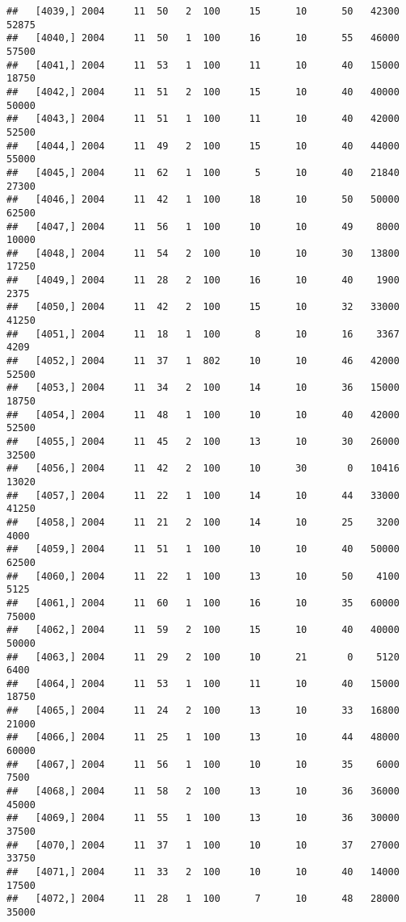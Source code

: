 \documentclass{article}\usepackage[]{graphicx}\usepackage[]{color}
\makeatletter
\newenvironment{kframe}{%
 \def\at@end@of@kframe{}%
 \ifinner\ifhmode%
  \def\at@end@of@kframe{\end{minipage}}%
  \begin{minipage}{\columnwidth}%
 \fi\fi%
 \def\FrameCommand##1{\hskip\@totalleftmargin \hskip-\fboxsep
 \colorbox{shadecolor}{##1}\hskip-\fboxsep
     \hskip-\linewidth \hskip-\@totalleftmargin \hskip\columnwidth}%
 \MakeFramed {\advance\hsize-\width
   \@totalleftmargin\z@ \linewidth\hsize
   \@setminipage}}%
 {\par\unskip\endMakeFramed%
 \at@end@of@kframe}
\newenvironment{knitrout}{}{} %
\makeatother
\begin{document}
\begin{knitrout}
\begin{kframe}
\begin{verbatim}
##   [4039,] 2004     11  50   2  100     15      10      50   42300   52875
##   [4040,] 2004     11  50   1  100     16      10      55   46000   57500
##   [4041,] 2004     11  53   1  100     11      10      40   15000   18750
##   [4042,] 2004     11  51   2  100     15      10      40   40000   50000
##   [4043,] 2004     11  51   1  100     11      10      40   42000   52500
##   [4044,] 2004     11  49   2  100     15      10      40   44000   55000
##   [4045,] 2004     11  62   1  100      5      10      40   21840   27300
##   [4046,] 2004     11  42   1  100     18      10      50   50000   62500
##   [4047,] 2004     11  56   1  100     10      10      49    8000   10000
##   [4048,] 2004     11  54   2  100     10      10      30   13800   17250
##   [4049,] 2004     11  28   2  100     16      10      40    1900    2375
##   [4050,] 2004     11  42   2  100     15      10      32   33000   41250
##   [4051,] 2004     11  18   1  100      8      10      16    3367    4209
##   [4052,] 2004     11  37   1  802     10      10      46   42000   52500
##   [4053,] 2004     11  34   2  100     14      10      36   15000   18750
##   [4054,] 2004     11  48   1  100     10      10      40   42000   52500
##   [4055,] 2004     11  45   2  100     13      10      30   26000   32500
##   [4056,] 2004     11  42   2  100     10      30       0   10416   13020
##   [4057,] 2004     11  22   1  100     14      10      44   33000   41250
##   [4058,] 2004     11  21   2  100     14      10      25    3200    4000
##   [4059,] 2004     11  51   1  100     10      10      40   50000   62500
##   [4060,] 2004     11  22   1  100     13      10      50    4100    5125
##   [4061,] 2004     11  60   1  100     16      10      35   60000   75000
##   [4062,] 2004     11  59   2  100     15      10      40   40000   50000
##   [4063,] 2004     11  29   2  100     10      21       0    5120    6400
##   [4064,] 2004     11  53   1  100     11      10      40   15000   18750
##   [4065,] 2004     11  24   2  100     13      10      33   16800   21000
##   [4066,] 2004     11  25   1  100     13      10      44   48000   60000
##   [4067,] 2004     11  56   1  100     10      10      35    6000    7500
##   [4068,] 2004     11  58   2  100     13      10      36   36000   45000
##   [4069,] 2004     11  55   1  100     13      10      36   30000   37500
##   [4070,] 2004     11  37   1  100     10      10      37   27000   33750
##   [4071,] 2004     11  33   2  100     10      10      40   14000   17500
##   [4072,] 2004     11  28   1  100      7      10      48   28000   35000

\end{verbatim}
\end{kframe}
\end{knitrout}
\end{document}
